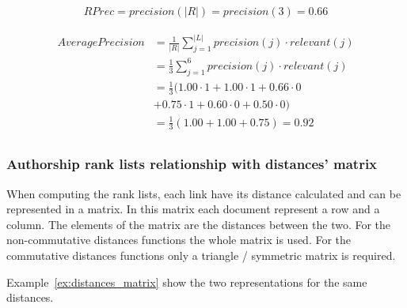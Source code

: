 \begin{example}
  \vspace{0.5cm}

  \begin{subexample}{\linewidth}
    \begin{equation}
      \begin{split}
        RPrec = precision(|R|) = precision(3) = 0.66
      \end{split}
    \end{equation}
  \end{subexample}

  \vspace{0.5cm}

  \begin{subexample}{\linewidth}
    \begin{equation}
      \begin{split}
        AveragePrecision &= \frac{1}{|R|} \sum_{j=1}^{|L|} precision(j) \cdot relevant(j) \\
                         &= \frac{1}{3} \sum_{j=1}^{6} precision(j) \cdot relevant(j) \\
                         &= \frac{1}{3} ( 1.00 \cdot 1 + 1.00 \cdot 1 + 0.66 \cdot 0 \\
                         &+ 0.75 \cdot 1 + 0.60 \cdot 0 + 0.50 \cdot 0) \\
                         &= \frac{1}{3} (1.00 + 1.00 + 0.75) = 0.92 \\
      \end{split}
    \end{equation}
  \end{subexample}

\end{example}

\subsubsection{Authorship rank lists relationship with distances' matrix}

When computing the rank lists, each link have its distance calculated and can be represented in a matrix.
In this matrix each document represent a row and a column.
The elements of the matrix are the distances between the two.
For the non-commutative distances functions the whole matrix is used.
For the commutative distances functions only a triangle / symmetric matrix is required.

Example~\ref{ex:distances_matrix} show the two representations for the same distances.

